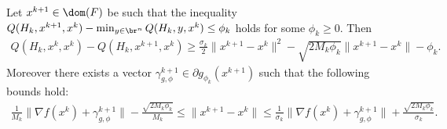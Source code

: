 \documentclass[11pt]{article}
\numberwithin{equation}{section}
\begin{document}
\begin{lemma}\label{lem:bound_step_size_inexact}
Let $x^{k+1} \in \dom(F)$ be such that the inequality $Q(H_k, x^{k+1},x^k)-\min_{y\in\br^n} Q(H_k, y,x^k)\leq \phi_k$ holds 
for some $\phi_k \geq 0$. Then 
\begin{align}
	\label{equ:bound_Qk_Qk1_inexact}
    Q(H_k,x^k,x^k) - Q(H_k,x^{k+1}, x^k) \geq \frac{\sigma_k}{2}\|x^{k+1}-x^k\|^2-\sqrt{2M_k\phi_k}\|x^{k+1}-x^k\| - \phi_k.
\end{align}
Moreover there exists a vector $\gamma_{g, \phi}^{k+1} \in \partial g_{\phi_k}(x^{k+1})$ such that the following bounds  hold: 
\begin{align}
    \label{equ:bound_step_size_inexact}
    \frac{1}{M_k}\|  \nabla f(x^k) + \gamma_{g, \phi}^{k+1} \|- \frac{\sqrt{2M_k\phi_k}}{M_k} 
    \leq 
    \|x^{k+1} - x^k\| 
    \leq 
    \frac{1}{\sigma_k}\|  \nabla f(x^k) + \gamma_{g, \phi}^{k+1} \| + \frac{\sqrt{2M_k\phi_k}}{\sigma_k}.
\end{align}
\end{lemma}
\end{document}

